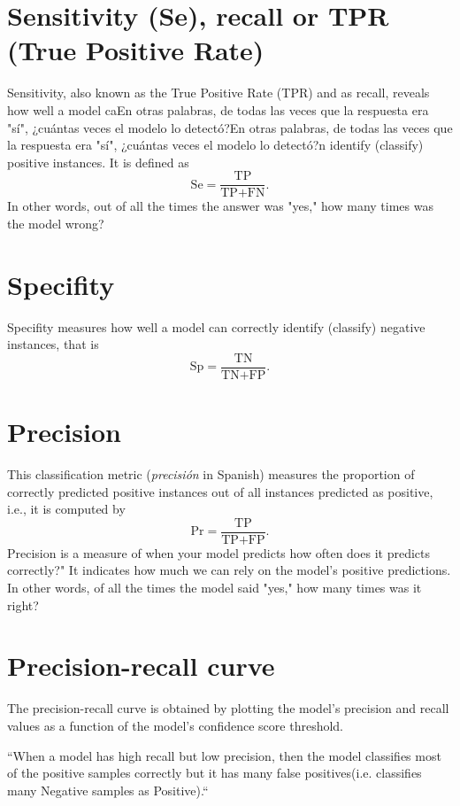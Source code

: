 \section{Sensitivity (Se), recall or TPR (True Positive Rate)}
Sensitivity, also known as the True Positive Rate (TPR) and as recall,
reveals how well a model caEn otras palabras, de todas las veces que la respuesta era "sí", ¿cuántas veces el modelo lo detectó?En otras palabras, de todas las veces que la respuesta era "sí", ¿cuántas veces el modelo lo detectó?n identify (classify) positive
instances. It is defined as
\begin{equation}
  \text{Se} = \frac{\text{TP}}{\text{TP} + \text{FN}}.
\end{equation}
In other words, out of all the times the answer was "yes," how many times was the model wrong?

\section{Specifity}
Specifity measures how well a model can correctly identify (classify)
negative instances, that is
\begin{equation}
  \text{Sp} = \frac{\text{TN}}{\text{TN} + \text{FP}}.
\end{equation}

\section{Precision}
This classification metric (\emph{precisión} in Spanish) measures the proportion of correctly predicted positive instances out of all instances predicted as positive, i.e., it is computed by
\begin{equation}
  \text{Pr} = \frac{\text{TP}}{\text{TP} + \text{FP}}.
\end{equation}
Precision is a measure of when your model predicts how often does it
predicts correctly?" It indicates how much we can rely on the model's
positive predictions.  In other words, of all the times the model said
"yes," how many times was it right?

\section{Precision-recall curve}
The precision-recall curve is obtained by plotting the model's
precision and recall values as a function of the model's confidence
score threshold.

“When a model has high recall but low precision, then the model
classifies most of the positive samples correctly but it has many
false positives(i.e. classifies many Negative samples as Positive).“


